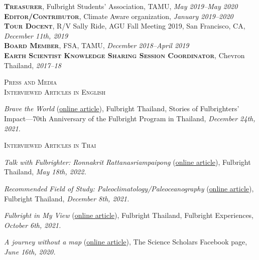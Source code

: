 \documentclass[10pt, letter]{article}
\newcommand{\margintext}[1]{\marginnote{\normalsize\textbf #1 |}}
\begin{document}
\bigskip
\textsc{\textbf{Treasurer}}, Fulbright Students’ Association, TAMU, \textit{May 2019–May 2020} \\
\textsc{\textbf{Editor/Contributor}}, Climate Aware organization, \textit{January 2019–2020} \\
\textsc{\textbf{Tour Docent}}, R/V Sally Ride, AGU Fall Meeting 2019, San Francisco, CA, \textit{December 11th, 2019}\\
\textsc{\textbf{Board Member}}, FSA, TAMU, \textit{December 2018–April 2019}\\
\textsc{\textbf{Earth Scientist Knowledge Sharing Session Coordinator}}, Chevron Thailand, \textit{2017–18}


\bigskip
\margintext{Outreach}
\textsc{Press and Media}\\
\textsc{Interviewed Articles in English}
\begin{etaremune}
\item \textit{Brave the World} (\href{https://issuu.com/fulbrightthailand/docs/storeis_fo_fulbrighters_impact}{online article}), Fulbright Thailand, Stories of Fulbrighters’ Impact—70th Anniversary of the Fulbright Program in Thailand, \textit{December 24th, 2021.}
\end{etaremune}

\textsc{Interviewed Articles in Thai}
\begin{etaremune}
\item \textit{Talk with Fulbrighter: Ronnakrit Rattanasriampaipong} (\href{https://www.fulbrightthai.org/fulbright-stories/khuykab-fulbrighter-rnkrsdi-ratnsrii-amaiphphngs}{online article}), Fulbright Thailand, \textit{May 18th, 2022.}
\item \textit{Recommended Field of Study: Paleoclimatology/Paleoceanography} (\href{https://www.fulbrightthai.org/knowledge-sharing/saakhaa-yaakaenanam-1-paleoclimatology-paleoceanography}{online article}), Fulbright Thailand, \textit{December 8th, 2021.}
\item \textit{Fulbright in My View} (\href{https://anyflip.com/afeb/buat/?fbclid=IwAR08dv9XF7UCimtM9SjwICdCSwSQfuTHNtPbbaepT4WZlTcNRXB9eNtUsi8}{online article}), Fulbright Thailand, Fulbright Experiences, \textit{October 6th, 2021.}
\item \textit{A journey without a map} (\href{https://www.facebook.com/ThaiScienceScholars/photos/a.114754726700839/170670231109288/?type=3}{online article}), The Science Scholars Facebook page, \textit{June 16th, 2020.}
\end{etaremune}
\end{document}
